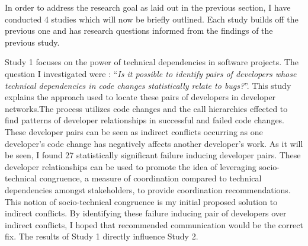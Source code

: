 In order to address the research goal as laid out in the previous section, I have conducted 4 studies which will
now be briefly outlined. Each study builds off the previous one and has research questions informed from the
findings of the previous study.

Study 1 focuses on the power of technical dependencies in software projects. The question I
investigated were : ``\textit{Is it possible to identify pairs of developers whose technical dependencies in 
code changes statistically relate to bugs?}''. This study explains the approach used to locate these pairs of developers 
in developer networks.The process utilizes code changes and the call hierarchies effected to find patterns of developer 
relationships in successful and failed code changes. These developer pairs can be seen as indirect conflicts occurring
as one developer's code change has negatively affects another developer's work. As it will be seen, I found 27 statistically significant failure 
inducing developer pairs. These developer relationships can be used to promote the idea of leveraging socio-technical 
congruence, a measure of coordination compared to technical dependencies amongst stakeholders, to provide coordination recommendations.
This notion of socio-technical congruence is my initial proposed solution to indirect conflicts. By identifying these failure
inducing pair of developers over indirect conflicts, I hoped that recommended communication would be the correct fix. The 
results of Study 1 directly influence Study 2.


